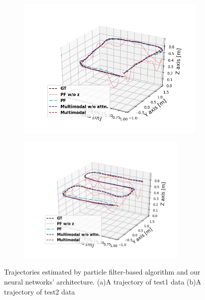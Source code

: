 \documentclass[letterpaper, 10 pt, conference]{ieeeconf}  %
\begin{document}
\begin{figure}[h]
	\centering
	\begin{subfigure}[b]{.50\textwidth}
		\centering
		\includegraphics[width=.9\textwidth]{1103_Karpe_trajectory_test1}
		\label{fig:trajectory1} 	
		\caption{}
	\end{subfigure}%
	\begin{subfigure}[b]{.50\textwidth}
		\centering
		\includegraphics[width=0.9\textwidth]{1103_Karpe_trajectory_test3}
		\label{fig:trajectory2} 	
		\caption{}
	\end{subfigure}
	\caption{Trajectories estimated by particle filter-based algorithm and our neural networks' architecture. (a)A trajectory of test1 data (b)A trajectory of test2 data}
	\label{fig:trajectory}
\end{figure} 
\end{document}
